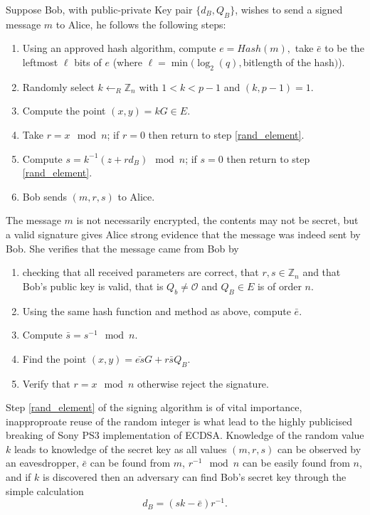 \documentclass{llncs}
\newcommand{\Z}{{\mathbb Z}}
\begin{document}
Suppose Bob, with public-private Key pair $\{d_B,Q_B\}$, wishes to send a signed message $m$ to Alice, he follows the following steps:
\begin{enumerate}
\item Using an approved hash algorithm, compute $e=Hash(m),$ take $\bar{e}$ to be the leftmost $\ell$ bits of $e$ (where $\ell=\min(\log_2(q),$bitlength of the hash$)$). 
\item\label{rand_element} Randomly select $k\leftarrow_R\Z_n$ with $1<k<p-1$ and $(k,p-1)=1$.
\item\label{scalar_mult} Compute the point $(x,y)=kG\in E$. 
\item Take $r=x\mod n$; if $r=0$ then return to step \ref{rand_element}.
\item Compute $s=k^{-1}(z+rd_B)\mod n$; if $s=0$ then return to step \ref{rand_element}.
\item Bob sends $(m,r,s)$ to Alice.
\end{enumerate}
The message $m$ is not necessarily encrypted, the contents may not be secret, but a valid signature gives Alice strong evidence that the message was indeed sent by Bob. She verifies that the message came from Bob by 

\begin{enumerate}
\item checking that all received parameters are correct, that $r,s\in\Z_n$ and that Bob's public key is valid, that is $Q_b\neq \mathcal{O}$ and $Q_B\in E$ is of order $n$.
\item Using the same hash function and method as above, compute $\bar{e}$.
\item Compute $\bar{s}=s^{-1}\mod n$.
\item Find the point $(x,y)=\bar{es}G+r\bar{s}Q_B$.
\item Verify that $r=x\mod n$ otherwise reject the signature.
\end{enumerate}

Step \ref{rand_element} of the signing algorithm is of vital importance, inapproproate reuse of the random integer is what lead to the highly publicised breaking of Sony PS3 implementation of ECDSA. Knowledge of the random value $k$ leads to knowledge of the secret key as all values $(m,r,s)$ can be observed by an eavesdropper, $\bar{e}$ can be found from $m$, $r^{-1}\mod n$ can be easily found from $n$, and if $k$ is discovered then an adversary can find Bob's secret key through the simple calculation $$d_B=(sk-\bar{e})r^{-1}.$$
\end{document}
